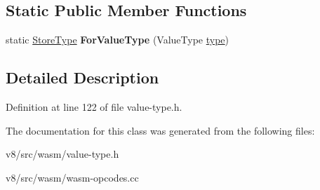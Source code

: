 \subsection*{Static Public Member Functions}
\begin{DoxyCompactItemize}
\item 
\mbox{\label{classv8_1_1internal_1_1wasm_1_1StoreType_adc399ccceda7cfeb6c251994b1b93591}} 
static \mbox{\hyperlink{classv8_1_1internal_1_1wasm_1_1StoreType}{Store\+Type}} {\bfseries For\+Value\+Type} (Value\+Type \mbox{\hyperlink{classstd_1_1conditional_1_1type}{type}})
\end{DoxyCompactItemize}


\subsection{Detailed Description}


Definition at line 122 of file value-\/type.\+h.



The documentation for this class was generated from the following files\+:\begin{DoxyCompactItemize}
\item 
v8/src/wasm/value-\/type.\+h\item 
v8/src/wasm/wasm-\/opcodes.\+cc\end{DoxyCompactItemize}
